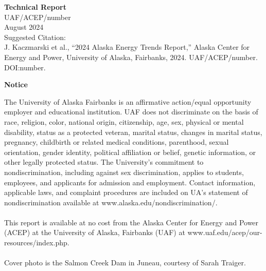 \newpage
\noindent
{\normalsize\bfseries Technical Report} \\
UAF/ACEP/number \\ 
\vspace{3ex}
August 2024 \\
Suggested Citation: \\
J. Kaczmarski et al., “2024 Alaska Energy Trends Report,” Alaska Center for Energy and Power, University of Alaska, Fairbanks, 2024. UAF/ACEP/number. DOI:number. 

\newpage
\noindent
{\centering
\bfseries\normalsize Notice
\par
}
\small The University of Alaska Fairbanks is an affirmative action/equal opportunity employer and educational institution. UAF does not discriminate on the basis of race, religion, color, national origin, citizenship, age, sex, physical or mental disability, status as a protected veteran, marital status, changes in marital status, pregnancy, childbirth or related medical conditions, parenthood, sexual orientation, gender identity, political affiliation or belief, genetic information, or other legally protected status. The University's commitment to nondiscrimination, including against sex discrimination, applies to students, employees, and applicants for admission and employment. Contact information, applicable laws, and complaint procedures are included on UA's statement of nondiscrimination available at www.alaska.edu/nondiscrimination/. \\
\\
\small This report is available at no cost from the Alaska Center for Energy and Power (ACEP) at the University of Alaska, Fairbanks (UAF) at www.uaf.edu/acep/our-resources/index.php. \\
\\
\small Cover photo is the Salmon Creek Dam in Juneau, courtesy of Sarah Traiger.